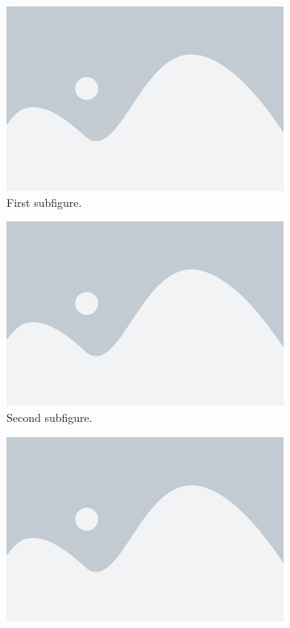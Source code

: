 \begin{figure}[h]
  \centering
  \begin{subfigure}{0.4\textwidth}
    \includegraphics[width=\textwidth]{../images/fig1.png}
    \caption{First subfigure.}
    \label{fig:a-b-first}
  \end{subfigure}
  \hfill
  \begin{subfigure}{0.4\textwidth}
    \includegraphics[width=\textwidth]{../images/fig1.png}
    \caption{Second subfigure.}
    \label{fig:a-b-second}
  \end{subfigure}
  \hfill
  \begin{subfigure}{0.4\textwidth}
    \includegraphics[width=\textwidth]{../images/fig1.png}

\end{subfigure}
\end{figure}
